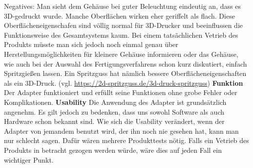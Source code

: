 \documentclass[]{article}
\begin{document}
Negatives:\newline
Man sieht dem Gehäuse bei guter Beleuchtung eindeutig an, dass es 3D-gedruckt wurde. Manche Oberflächen wirken eher geriffelt als flach. Diese Oberflächeneigenschafen sind völlig normal für 3D-Drucker und beeinflussen die Funktionsweise des Gesamtsystems kaum. Bei einem tatsächlichen Vetrieb des Produkts müsste man sich jedoch noch einmal genau über Herstellungsmöglichkeiten für kleinere Gehäuse informieren oder das Gehäuse, wie auch bei der Auswahl des Fertigungsverfahrens schon kurz diskutiert, einfach Spritzgießen lassen. Ein Spritzguss hat nämlich bessere Oberflächeneigenschaften als ein 3D-Druck.
\vspace{4mm}\newline
(vgl. \url{https://2d-spritzguss.de/3d-druck-spritzguss})
\vspace{4mm}\newline
\textbf{Funktion}\newline
Der Adapter funktioniert und erfüllt seine Funktionen ohne grobe Fehler oder Komplikationen.
\vspace{4mm}\newline
\textbf{Usability}\newline
Die Anwendung des Adapter ist grundsätzlich angenehm. Es gilt jedoch zu bedenken, dass uns sowohl Software als auch Hardware schon bekannt sind. Wie sich die Usability verändert, wenn der Adapter von jemandem benutzt wird, der ihn noch nie gesehen hat, kann man nur schlecht sagen. Dafür wären mehrere Produkttests nötig. Falls ein Vetrieb des Produkts in betracht gezogen werden würde, wäre dies auf jeden Fall ein wichtiger Punkt.\newline
\end{document}
